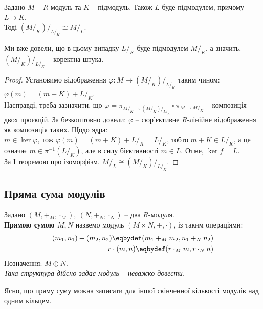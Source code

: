 \documentclass{math_library}
\begin{document}
\begin{theorem}
Задано $M$ -- $R$-модуль та $K$ -- підмодуль. Також $L$ буде підмодулем, причому $L \supset K$.\\
Тоді $(M/_K)/_{L/_K} \cong M/_L$.
\end{theorem}

\begin{remark}
Ми вже довели, що в цьому випадку $L/_K$ буде підмодулем $M/_K$, а значить, $(M/_K)/_{L/_K}$ -- коректна штука.
\end{remark}

\begin{proof}
Установимо відображення $\varphi \colon M \to (M/_K)/_{L/_K}$ таким чином:\\
$\varphi(m) = (m+K) + L/_K$.\\
Насправді, треба зазначити, що $\varphi = \pi_{M/_K \to (M/_K)/_{L/_K}} \circ \pi_{M \to M/_K}$ -- композиція двох проєкцій. За безкоштовно довели: $\varphi$ -- сюр'єктивне $R$-лінійне відображення як композиція таких. Щодо ядра:\\
$m \in \ker \varphi$, тож $\varphi(m) = (m+K) + L/_K = L/_K$, тобто $m+K \in L/_K$, а це означає $m \in \pi^{-1}(L/_K)$, але в силу бієктивності  $m \in L$. Отже, $\ker f = L$.\\
За І теоремою про ізоморфізм, $M/_L \cong (M/_K)/_{L/_K}$. 
\end{proof}

\subsection{Пряма сума модулів}
\begin{definition}
Задано $(M,+_M,\cdot_M),\ (N,+_N,\cdot_N)$ -- два $R$-модуля.\\
\textbf{Прямою сумою $M,N$} назвемо модуль $(M \times N, +, \cdot)$, із таким операціями:
\begin{align*}
(m_1,n_1) + (m_2,n_2) \eqbydef (m_1 +_M m_2, n_1 +_N n_2) \\
r \cdot (m,n) \eqbydef (r \cdot_M m, r \cdot_N n)
\end{align*}
Позначення: $M \oplus N$.\\
\textit{Така структура дійсно задає модуль -- неважко довести.}
\end{definition}

\begin{remark}
Ясно, що пряму суму можна записати для іншої скінченної кількості модулів над одним кільцем.
\end{remark}
\end{document}
